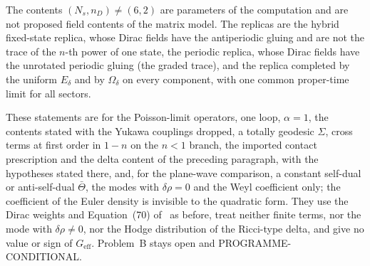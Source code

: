 The contents \((N_s,n_D)\neq(6,2)\) are parameters of the computation and are not proposed field contents of the matrix model. The replicas are the hybrid fixed-state replica, whose Dirac fields have the antiperiodic gluing and are not the trace of the \(n\)-th power of one state, the periodic replica, whose Dirac fields have the unrotated periodic gluing (the graded trace), and the replica completed by the uniform \(E_\delta\) and by \(\Omega_\delta\) on every component, with one common proper-time limit for all sectors.

These statements are for the Poisson-limit operators, one loop, \(\alpha=1\), the contents stated with the Yukawa couplings dropped, a totally geodesic \(\Sigma\), cross terms at first order in \(1-n\) on the \(n<1\) branch, the imported contact prescription and the delta content of the preceding paragraph, with the hypotheses stated there, and, for the plane-wave comparison, a constant self-dual or anti-self-dual \(\bar\Theta\), the modes with \(\delta\rho=0\) and the Weyl coefficient only; the coefficient of the Euler density is invisible to the quadratic form. They use the Dirac weights and Equation~(70) of~\cite{Solodukhin2011} as before, treat neither finite terms, nor the mode with \(\delta\rho\neq0\), nor the Hodge distribution of the Ricci-type delta, and give no value or sign of \(G_{\mathrm{eff}}\). Problem~B stays open and PROGRAMME-CONDITIONAL.
